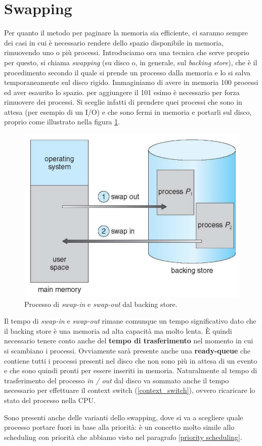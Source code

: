 % 
\section{Swapping}\label{swapping}
Per quanto il metodo per paginare la memoria sia efficiente, ci saranno sempre dei casi in cui è necessario rendere dello spazio disponibile in memoria, rimuovendo uno o più processi. Introduciamo ora una tecnica che serve proprio per questo, si chiama \textit{swapping} (su disco o, in generale, sul \textit{backing store}), che è il procedimento secondo il quale si prende un processo dalla memoria e lo si salva temporaneamente sul disco rigido. Immaginiamo di avere in memoria 100 processi ed aver esaurito lo spazio. per aggiungere il 101 esimo è necessario per forza rimuovere dei processi. Si sceglie infatti di prendere quei processi che sono in attesa (per esempio di un I/O) e che sono fermi in memoria e portarli sul disco, proprio come illustrato nella figura \ref{fig:swapping}.
\begin{figure}[h]
    \centering
    \includegraphics[width = .45\textwidth]{../res/imgs/main memory/swapping.png}
    \caption{Processo di \textit{swap-in} e \textit{swap-out} dal backing store.}
    \label{fig:swapping}
\end{figure}
Il tempo di \textit{swap-in} e \textit{swap-out} rimane comunque un tempo significativo dato che il backing store è una memoria ad alta capacità ma molto lenta. È quindi necessario tenere conto anche del \textbf{tempo di trasferimento} nel momento in cui si scambiano i processi. Ovviamente sarà presente anche una \textbf{ready-queue} che contiene tutti i processi presenti nel disco che non sono più in attesa di un evento e che sono quindi pronti per essere inseriti in memoria. Naturalmente al tempo di trasferimento del processo \textit{in / out} dal disco va sommato anche il tempo necessario per effettuare il context switch (\ref{context_switch}), ovvero ricaricare lo stato del processo nella CPU.

Sono presenti anche delle varianti dello swapping, dove si va a scegliere quale processo portare fuori in base alla priorità: è un concetto molto simile allo scheduling con priorità che abbiamo visto nel paragrafo \ref{priority scheduling}.

